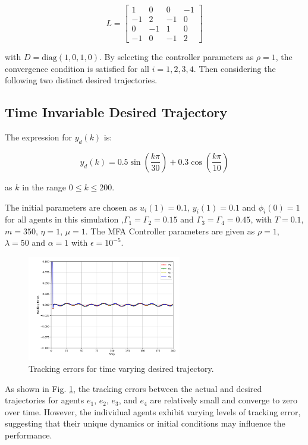 \documentclass[journal,onecolumn]{IEEEtran}
\begin{document}
\[
    L = \begin{bmatrix}
    1 & 0 & 0 & -1 \\
    -1 & 2 & -1 & 0 \\
    0 & -1 & 1 & 0 \\
    -1 & 0 & -1 & 2
    \end{bmatrix}
\]

with \( D = \text{diag}(1, 0, 1, 0) \). By selecting the controller parameters as \( \rho = 1 \), the convergence condition  is satisfied for all \( i = 1, 2, 3, 4 \). Then considering the following two distinct desired trajectories.


\subsection{Time Invariable Desired Trajectory}

The expression for \( y_d(k) \) is:

\[
y_d(k) = 0.5 \sin\left(\frac{k \pi}{30}\right) + 0.3  \cos\left(\frac{k \pi}{10}\right)
\]

as \( k \) in the range \( 0 \leq k \leq 200 \).

The initial parameters are chosen as \(u_i(1)=0.1\), \(y_i(1)=0.1\) and \(\phi_i(0)=1 \) for all agents in this simulation ,\(\Gamma_{1}=\Gamma_{2}=0.15\) and \(\Gamma_{3}=\Gamma_{4}=0.45\), with \(T=0.1\), \(m=350\), \(\eta=1\), \(\mu=1\). The MFA Controller parameters are given as \(\rho=1\), \(\lambda=50\) and \(\alpha=1\) with \(\epsilon=10^{-5}\).
\begin{figure}[H]
    \centering
    \includegraphics[width=0.6\textwidth]{Figure_2.png}
    \caption{Tracking errors for time varying desired trajectory.}
    \label{fig:figure_2} %
\end{figure}

As shown in Fig. \ref{fig:figure_2}, the tracking errors between the actual and desired trajectories for agents $e_1$, $e_2$, $e_3$, and $e_4$ are relatively small and converge to zero over time. However, the individual agents exhibit varying levels of tracking error, suggesting that their unique dynamics or initial conditions may influence the performance.
\end{document}
